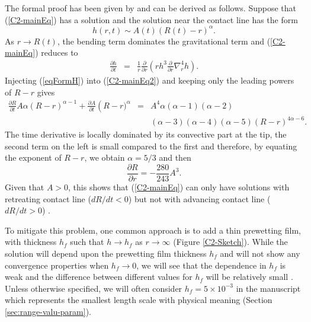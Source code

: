The formal proof  has been given by \citet{Flitton:1999iv}  and can be
derived as follows.  Suppose that  (\ref{C2-mainEq}) has a solution and
the solution near the contact line has the form
\begin{equation}
  h(r,t) \sim A(t)(R(t)-r)^{\alpha}.
  \label{eqFormH}
\end{equation}
As $r \rightarrow R(t)$, the  bending term dominates the gravitational
term and (\ref{C2-mainEq}) reduces to
\begin{eqnarray}
  \frac{\partial       h}{\partial       t}&      =&\frac{1}{       r}
                                                     \frac{\partial}{\partial r}\left( rh^3 \frac{\partial}{\partial r}\nabla_r^4h\right).
                                                     \label{C2-mainEq2}
\end{eqnarray}
Injecting (\ref{eqFormH}) into (\ref{C2-mainEq2}) and keeping only the
leading powers of $R-r$ gives
\begin{eqnarray}
  \frac{\partial    R}{\partial    t}    A\alpha\left(R-r\right)^{\alpha-1}+
  \frac{\partial           A}{\partial           t}\left(R-r)^{\alpha}
  &=&A^4\alpha(\alpha-1)(\alpha-2)\nonumber\\
  &&(\alpha-3)(\alpha-4)(\alpha-5)(R-r)^{4\alpha-6}.\nonumber
\end{eqnarray}
The time derivative is locally dominated by its convective part at the
tip, the second  term on the left  is small compared to  the first and
therefore, by equating the exponent of $R-r$, we obtain $\alpha = 5/3$
and then
\begin{equation}
  \frac{\partial R}{\partial r} =-\frac{280}{243} A^3.
\end{equation}
Given  that $A>0$,  this shows  that (\ref{C2-mainEq})  can only  have
solutions  with  retreating  contact  line ($dR/dt<0$)  but  not  with
advancing             contact             line             ($dR/dt>0$)
\citep{Lister:2013ia,Flitton:1999iv}.

To  mitigate this  problem,  one  common approach  is  to  add a  thin
prewetting film, with thickness $h_f$  such that $h\rightarrow h_f$ as
$r\rightarrow  \infty$ (Figure  \ref{C2-Sketch}).  While  the solution
will depend upon the prewetting film thickness $h_f$ and will not show
any convergence properties  when $h_f\rightarrow 0$, we  will see that
the dependence in  $h_f$ is weak and the  difference between different
values      for      $h_f$      will     be      relatively      small
\citep{Lister:2013ia,Anonymous:QWXp_4JV}.  Unless otherwise specified,
we will often consider $h_f =  5\times 10^{-3}$ in the manuscript which
represents the  smallest length  scale with physical  meaning (Section
\ref{sec:range-valu-param}).



